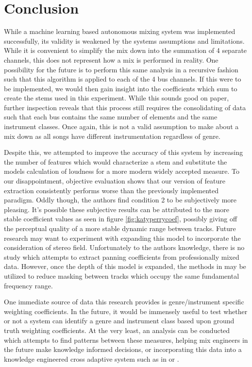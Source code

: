 \documentclass{article}
\begin{document}
\section{Conclusion}
\label{sec:Conclusion}

While a machine learning based autonomous mixing system was implemented successfully, its validity is weakened by the systems assumptions and limitations. While it is convenient to simplify the mix down into the summation of 4 separate channels, this does not represent how a mix is performed in reality.  One possibility for the future is to perform this same analysis in a recursive fashion such that this algorithm is applied to each of the 4 bus channels.  If this were to be implemented, we would then gain insight into the coefficients which sum to create the stems used in this experiment.  While this sounds good on paper, further inspection reveals that this process still requires the consolidating of data such that each bus contains the same number of elements and the same instrument classes.  Once again, this is not a valid assumption to make about a mix down as all songs have different instrumentation regardless of genre.

Despite this, we attempted to improve the accuracy of this system by increasing the number of features which would characterize a stem and substitute the models calculation of loudness for a more modern widely accepted measure.  To our disappointment, objective evaluation shows that our version of feature extraction consistently performs worse than the previously implemented paradigm.  Oddly though, the authors find condition 2 to be subjectively more pleasing.  It's possible these subjective results can be attributed to the more stable coefficient values as seen in figure \ref{fig:katyperrycoef}, possibly giving off the perceptual quality of a more stable dynamic range between tracks.  Future research may want to experiment with expanding this model to incorporate the consideration of stereo field.  Unfortunately to the authors knowledge, there is no study which attempts to extract panning coefficients from professionally mixed data.  However, once the depth of this model is expanded, the methods in \cite{perez2010real} may be utilized to reduce masking between tracks which occupy the same fundamental frequency range.

One immediate source of data this research provides is genre/instrument specific weighting coefficients.  In the future, it would be immensely useful to test whether or not a system can identify a genre and instrument class based upon ground truth weighting coefficients.  At the very least, an analysis can be conducted which attempts to find patterns between these measures, helping mix engineers in the future make knowledge informed decisions, or incorporating this data into a knowledge engineered cross adaptive system such as in \cite{de2013knowledge} or \cite{scott2013instrument}.
\end{document}
